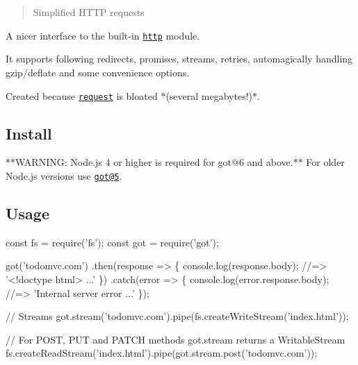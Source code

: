 \section*{~\newline
  ~\newline
 ~\newline
 ~\newline
 }

\begin{quote}
Simplified H\+T\+TP requests \end{quote}


\href{https://travis-ci.org/sindresorhus/got}{\tt } \href{https://coveralls.io/github/sindresorhus/got?branch=master}{\tt } \href{https://npmjs.com/got}{\tt }

A nicer interface to the built-\/in \href{http://nodejs.org/api/http.html}{\tt {\ttfamily http}} module.

It supports following redirects, promises, streams, retries, automagically handling gzip/deflate and some convenience options.

Created because \href{https://github.com/request/request}{\tt {\ttfamily request}} is bloated $\ast$(several megabytes!)$\ast$.

\subsection*{Install}

$\ast$$\ast$\+W\+A\+R\+N\+I\+NG\+: Node.\+js 4 or higher is required for got@6 and above.$\ast$$\ast$ For older Node.\+js versions use \href{https://github.com/sindresorhus/got/tree/v5.x}{\tt got@5}.




\subsection*{Usage}


\begin{DoxyCode}
const fs = require('fs');
const got = require('got');

got('todomvc.com')
  .then(response => \{
    console.log(response.body);
    //=> '<!doctype html> ...'
  \})
  .catch(error => \{
    console.log(error.response.body);
    //=> 'Internal server error ...'
  \});

// Streams
got.stream('todomvc.com').pipe(fs.createWriteStream('index.html'));

// For POST, PUT and PATCH methods got.stream returns a WritableStream
fs.createReadStream('index.html').pipe(got.stream.post('todomvc.com'));
\end{DoxyCode}


